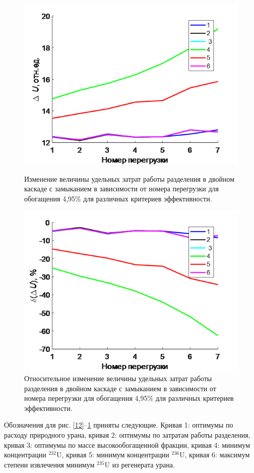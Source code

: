 \begin{figure}[ht]
    \begin{minipage}{.5\textwidth}
      \centering
      \includegraphics[width=.8\linewidth]{images/net/12}  
      \caption{Изменение величины удельных затрат работы разделения в двойном каскаде с замыканием в зависимости от номера перегрузки для обогащения 4,95\% для различных критериев эффективности.}
      \label{12}
    \end{minipage}
    \begin{minipage}{.5\textwidth}
      \centering
      \includegraphics[width=.8\linewidth]{images/net/13}  
      \caption{Относительное изменение величины удельных затрат работы разделения в двойном каскаде с замыканием в зависимости от номера перегрузки для обогащения 4,95\% для различных критериев эффективности.}
      \label{13}
    \end{minipage}
\end{figure}

Обозначения для рис. \ref{12}–\ref{13} приняты следующие. Кривая 1: оптимумы по расходу природного урана, кривая 2: оптимумы по затратам работы разделения, кривая 3: оптимумы по массе высокообогащенной фракции, кривая 4: минимум концентрации $^{232}$U, кривая 5: минимум концентрации $^{236}$U, кривая 6: максимум степени извлечения минимум $^{235}$U из регенерата урана.

